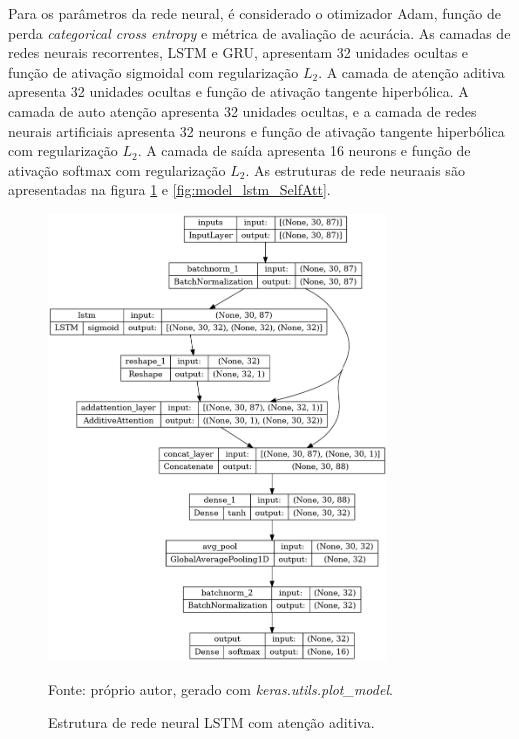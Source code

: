         \ipar Para os parâmetros da rede neural, é considerado o otimizador Adam, função de perda \textit{categorical cross entropy} e métrica de avaliação de acurácia. As camadas de redes neurais recorrentes, LSTM e GRU, apresentam 32 unidades ocultas e função de ativação sigmoidal com regularização $L_{2}$. A camada de atenção aditiva apresenta 32 unidades ocultas e função de ativação tangente hiperbólica. A camada de auto atenção apresenta 32 unidades ocultas, e a camada de redes neurais artificiais apresenta 32 neurons e função de ativação tangente hiperbólica com regularização $L_{2}$. A camada de saída apresenta 16 neurons e função de ativação softmax com regularização $L_{2}$. As estruturas de rede neuraais são apresentadas na figura \ref{fig:model_lstm_BauhAtt} e \ref{fig:model_lstm_SelfAtt}.


        \begin{figure}[H]
            \centering
            \caption{Estrutura de rede neural LSTM com atenção aditiva.}
            \label{fig:model_lstm_BauhAtt}
            \includegraphics[width=0.8\textwidth]{./imagens/model_lstm_BauhAtt.png}
            \par \footnotesize Fonte: próprio autor, gerado com \textit{keras.utils.plot\_model}.
        \end{figure}

